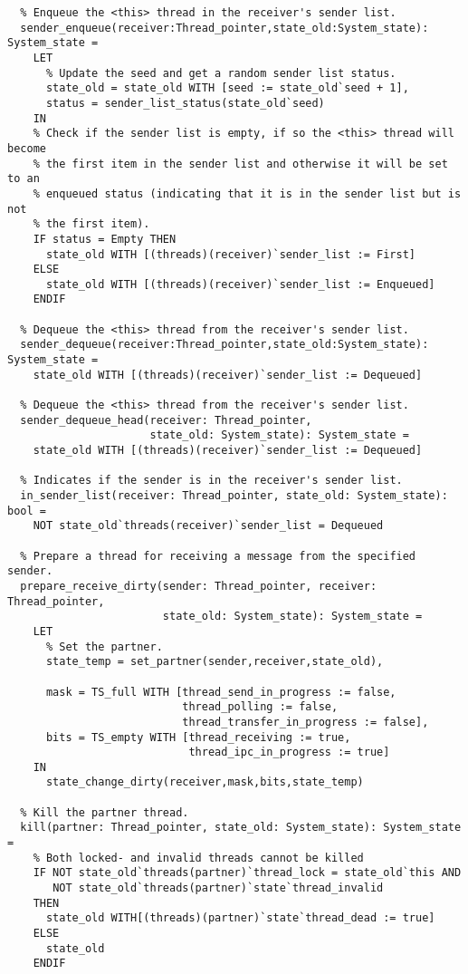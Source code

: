 \begin{lstlisting}
  % Enqueue the <this> thread in the receiver's sender list.
  sender_enqueue(receiver:Thread_pointer,state_old:System_state): System_state =
    LET 
      % Update the seed and get a random sender list status.
      state_old = state_old WITH [seed := state_old`seed + 1],
      status = sender_list_status(state_old`seed)
    IN
    % Check if the sender list is empty, if so the <this> thread will become
    % the first item in the sender list and otherwise it will be set to an
    % enqueued status (indicating that it is in the sender list but is not
    % the first item).
    IF status = Empty THEN
      state_old WITH [(threads)(receiver)`sender_list := First]
    ELSE
      state_old WITH [(threads)(receiver)`sender_list := Enqueued]
    ENDIF

  % Dequeue the <this> thread from the receiver's sender list.
  sender_dequeue(receiver:Thread_pointer,state_old:System_state): System_state =
    state_old WITH [(threads)(receiver)`sender_list := Dequeued]

  % Dequeue the <this> thread from the receiver's sender list.
  sender_dequeue_head(receiver: Thread_pointer, 
                      state_old: System_state): System_state =
    state_old WITH [(threads)(receiver)`sender_list := Dequeued]

  % Indicates if the sender is in the receiver's sender list.
  in_sender_list(receiver: Thread_pointer, state_old: System_state): bool =
    NOT state_old`threads(receiver)`sender_list = Dequeued 

  % Prepare a thread for receiving a message from the specified sender.
  prepare_receive_dirty(sender: Thread_pointer, receiver: Thread_pointer, 
                        state_old: System_state): System_state =
    LET
      % Set the partner.
      state_temp = set_partner(sender,receiver,state_old),

      mask = TS_full WITH [thread_send_in_progress := false,
                           thread_polling := false,
                           thread_transfer_in_progress := false],
      bits = TS_empty WITH [thread_receiving := true, 
                            thread_ipc_in_progress := true]
    IN
      state_change_dirty(receiver,mask,bits,state_temp)
       
  % Kill the partner thread.
  kill(partner: Thread_pointer, state_old: System_state): System_state =
    % Both locked- and invalid threads cannot be killed
    IF NOT state_old`threads(partner)`thread_lock = state_old`this AND 
       NOT state_old`threads(partner)`state`thread_invalid
    THEN
      state_old WITH[(threads)(partner)`state`thread_dead := true]
    ELSE
      state_old
    ENDIF


\end{lstlisting}
